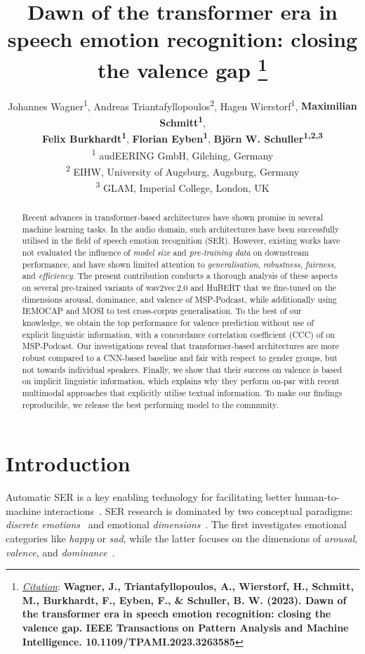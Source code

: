 \documentclass{article}
\title{
Dawn of the transformer era in speech emotion recognition: closing the valence gap
\thanks{\textit{\underline{Citation}}: 
\textbf{Wagner, J., Triantafyllopoulos, A., Wierstorf, H., Schmitt, M., Burkhardt, F., Eyben, F., \& Schuller, B. W. (2023). Dawn of the transformer era in speech emotion recognition: closing the valence gap. IEEE Transactions on Pattern Analysis and Machine Intelligence. 10.1109/TPAMI.2023.3263585}} 
}
\author{
Johannes Wagner\textsuperscript{1}, Andreas Triantafyllopoulos\textsuperscript{2}, Hagen Wierstorf\textsuperscript{1}, \textbf{Maximilian Schmitt\textsuperscript{1}}, \\\textbf{Felix Burkhardt\textsuperscript{1}}, \textbf{Florian Eyben\textsuperscript{1}}, \textbf{Bj\"{o}rn W. Schuller\textsuperscript{1,2,3}}\\
\textsuperscript{1} audEERING GmbH, Gilching, Germany\\
\textsuperscript{2} EIHW, University of Augsburg, Augsburg, Germany\\
\textsuperscript{3} GLAM, Imperial College, London, UK\\
}
\newcommand\msppodcast{\mbox{MSP-Podcast}}
\newcommand\iemocap{\mbox{IEMOCAP}}
\newcommand\mosi{\mbox{MOSI}}
\newcommand{\wtov}{wav2vec\,2.0}
\newcommand{\hubert}{HuBERT}
\begin{document}
\maketitle

\begin{abstract}
    Recent advances in transformer-based architectures have shown promise in several machine learning tasks.
    In the audio domain, such architectures have been successfully utilised in the field of speech emotion recognition (SER).
    However, existing works have not evaluated the influence of \emph{model size} and \emph{pre-training data} on downstream performance, and have shown limited attention to \emph{generalisation}, \emph{robustness}, \emph{fairness}, and \emph{efficiency}.
    The present contribution conducts a thorough analysis of these aspects on several pre-trained variants of {\wtov} and {\hubert} that we fine-tuned on the dimensions arousal, dominance, and valence of {\msppodcast}, while additionally using {\iemocap} and {\mosi} to test cross-corpus generalisation.
    To the best of our knowledge, we obtain the top performance for valence prediction without use of explicit linguistic information, with a concordance correlation coefficient (CCC) of  on {\msppodcast}.
    Our investigations reveal that transformer-based architectures are more robust  compared to a CNN-based baseline and fair with respect to gender groups, but not towards individual speakers.
    Finally, we show that their success on valence is based on implicit linguistic information, which explains why they perform on-par with recent multimodal approaches that explicitly utilise textual information.
    To make our findings reproducible, we release the best performing model to the community.
\end{abstract}

\glsresetall


\section{Introduction}
\label{sec:introduction}

Automatic \ac{SER} is a key enabling technology for 
facilitating better human-to-machine interactions~\citep{Schuller18-SER}.
\ac{SER} research is dominated by two conceptual paradigms: \emph{discrete emotions}~\citep{ekman1992argument} and emotional \emph{dimensions}~\citep{russell1977evidence}.
The first investigates emotional categories like \emph{happy} or \emph{sad}, while the latter focuses on the dimensions of \emph{arousal}, \emph{valence}, and \emph{dominance}~\citep{russell1977evidence}.
\end{document}
